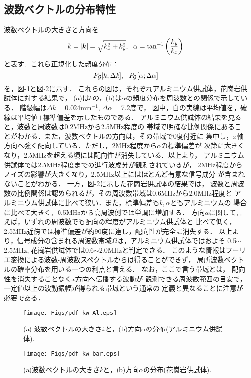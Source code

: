 \subsection{波数ベクトルの分布特性}
波数ベクトルの大きさと方向を
\begin{equation}
	k=\left| \fat{k} \right|=\sqrt{k_x^2+k_y^2},  \ \ 
	\alpha = \tan^{-1} \left( \frac{k_y}{k_x} \right)
	\label{eqn:kpol}
\end{equation}
と表す．これら正規化した頻度分布：
\[
	P_{\cal G}[k;\Delta k], \ \ 
	P_{\cal G}[\alpha;\Delta \alpha]
\]
を，図-\ref{fig:fig9}と図-\ref{fig:fig10}に示す．
これらの図は，それぞれアルミニウム供試体，花崗岩供試体に対する結果で，
(a)は$k$の，(b)は$\alpha$の頻度分布を周波数との関係で示している．
階級幅は$\Delta k=0.024$mm$^{-1}$, $\Delta \alpha=$7.2度で，
図中，白の実線は平均値を，破線は平均値$\pm$標準偏差を示したものである．
アルミニウム供試体の結果を見ると，波数と周波数は0.2MHzから2.5MHz程度の
帯域で明確な比例関係にあることがわかる．また，波数ベクトルの方向は，その帯域で0度付近に
集中し，$x$軸方向へ強く配向している．ただし，2MHz程度から$\alpha$の標準偏差が
次第に大きくなり，2.5MHzを超える頃には配向性が消失している．以上より，
アルミニウム供試体では2.5MHz程度までの進行波成分が観測されているが，
2MHz程度からノイズの影響が大きくなり，2.5MHz以上にはほとんど有意な信号成分
が含まれないことがわかる．
一方，図-\ref{fig:fig10}に示した花崗岩供試体の結果では，
波数と周波数の比例関係は認められるが，その周波数帯域は0.6MHzから2.0MHz程度と
アルミニウム供試体に比べて狭い．また，標準偏差も$k,\alpha$ともアルミニウムの
場合に比べて大きく，0.5MHzから高周波側では単調に増加する．
方向$\alpha$に関して言えば，いずれの周波数でも配向の程度がアルミニウム供試体と
比べて低く，2.5MHz近傍では標準偏差が約90度に達し，配向性が完全に消失する．
以上より，信号成分の含まれる周波数帯域$\Omega$は，アルミニウム供試体ではおよそ
0.5$\sim$2.5MHz, 花崗岩供試体では0.6$\sim$2.0MHzと判定できる．
このような情報はフーリエ変換による波数-周波数スペクトルからは得ることができず，
局所波数ベクトルの確率分布を用いる一つの利点と言える．
なお，ここで言う帯域とは， 配向性を消失することなく$x$方向へ伝播する波動が
観測できる周波数範囲の目安で，一定値以上の波動振幅が得られる帯域という通常の
定義と異なることに注意が必要である．
\begin{figure}
\begin{center}
	\texttt{[image: Figs/pdf\_kw\_Al.eps]}
	\caption{(a) 波数ベクトルの大きさ$k$と，(b)方向$\alpha$の分布(アルミニウム供試体).}
	\label{fig:fig9}
\end{center}
\end{figure}
\begin{figure}
\begin{center}
	\texttt{[image: Figs/pdf\_kw\_bar.eps]}
	\caption{(a)波数ベクトルの大きさ$k$と，(b)方向$\alpha$の分布(花崗岩供試体).}
	\label{fig:fig10}
\end{center}
\end{figure}
